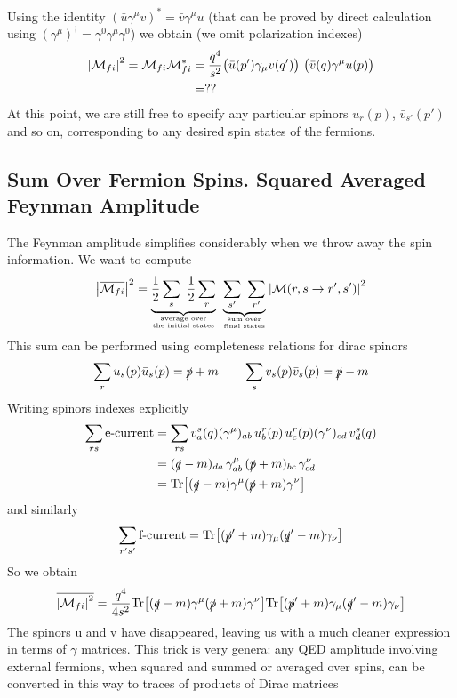 \documentclass[TheoreticalPhy_ModB.tex]{subfiles}
\begin{document}
Using the identity $(\bar{u} \gamma^{\mu} v)^* = \bar{v} \gamma^{\mu} u$ (that can be proved by direct calculation using
$(\gamma^{\mu})^{\dagger} = \gamma^0 \gamma^{\mu} \gamma^0$) we obtain (we omit polarization indexes)
\[
\begin{split}
\left\lvert \mathcal{M}_{fi} \right\rvert^2 = \mathcal{M}_{fi} \mathcal{M}^*_{fi}	& = \frac{q^4}{s^2} \bigl( \bar{u}(p')\gamma_{\mu} v(q') \bigr) \
											\bigl( \bar{v}(q) \gamma^{\mu}u(p) \bigr) \\
										& = ??
\end{split}
\]
At this point, we are still free to specify any particular spinors $u_r(p)$, $\bar{v}_{s'}(p')$ and so on, corresponding to any desired spin states of the fermions.

\subsection{Sum Over Fermion Spins. Squared Averaged Feynman Amplitude}
The Feynman amplitude simplifies considerably when we throw away the spin information. We want to compute
\[
\abs{\overline{\mathM_{fi}}}^2 = \underbrace{\frac{1}{2} \sum_s \ \frac{1}{2} \sum_r}_{\textup{average over} \atop \text{the initial states}} \ 
	\underbrace{\sum_{s'} \ \sum_{r'}}_{\textup{sum over} \atop \text{final states}} \abs{\mathM(r,s \to r',s')}^2
\]
This sum can be performed using completeness relations for dirac spinors
\[
\sum_r u_s(p) \bar{u}_s(p) = \slashed p + m
\qquad
\sum_s v_s(p) \bar{v}_s(p) = \slashed p - m
\]
Writing spinors indexes explicitly 
\[
\begin{split}
\sum_{rs} \text{e-current}	& = \sum_{rs} \bar{v}^s_a(q) (\gamma^{\mu})_{ab} \, u^r_b(p) \, \bar{u}^r_c(p) (\gamma^{\nu})_{cd} \, v_d^s(q) \\
					& = (\slashed q - m)_{da} \, \gamma^{\mu}_{ab} \, (\slashed p + m)_{bc} \, \gamma_{cd}^{\nu} \\
					& = \textup{Tr} \bigl[ (\slashed q - m) \gamma^{\mu} (\slashed p + m) \gamma^{\nu} \bigr]
\end{split}
\]
and similarly
\[
\sum_{r's'} \text{f-current} = \textup{Tr} \bigl[ (\slashed p' + m) \gamma_{\mu} (\slashed q' - m)\gamma_{\nu} \bigr]
\]
So we obtain
\[
\overline{\left\lvert \mathcal{M}_{fi} \right\rvert^2} = \frac{q^4}{4s^2} \textup{Tr} \bigl[ (\slashed q - m) \gamma^{\mu} (\slashed p + m) \gamma^{\nu} \bigr]
	\textup{Tr} \bigl[ (\slashed p' + m) \gamma_{\mu} (\slashed q' -m) \gamma_{\nu} \bigr]
\]
The spinors u and v have disappeared, leaving us with a much cleaner expression in terms of $\gamma$ matrices. This trick is very genera: any QED amplitude involving external fermions, when squared and summed or averaged over spins, can be converted in this way to traces of products of Dirac matrices
\end{document}
